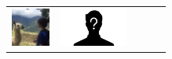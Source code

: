 \documentclass[usenames,dvipsnames,aspectratio=169,12pt]{beamer}
\begin{document}
\begin{frame}
\begin{figure}
\begin{tabular}{ccccc}
    {\includegraphics[height = 0.5in]{me.jpg}}         &
    {\includegraphics[height = 0.5in]{andreas.png}}
    \end{tabular}
  \end{figure}
\end{frame}
\end{document}
